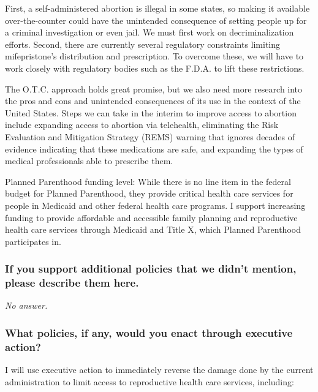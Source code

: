 First, a self-administered abortion is illegal in some states, so making
it available over-the-counter could have the unintended consequence of
setting people up for a criminal investigation or even jail. We must
first work on decriminalization efforts. Second, there are currently
several regulatory constraints limiting mifepristone's distribution and
prescription. To overcome these, we will have to work closely with
regulatory bodies such as the F.D.A. to lift these restrictions.

The O.T.C. approach holds great promise, but we also need more research
into the pros and cons and unintended consequences of its use in the
context of the United States. Steps we can take in the interim to
improve access to abortion include expanding access to abortion via
telehealth, eliminating the Risk Evaluation and Mitigation Strategy
(REMS) warning that ignores decades of evidence indicating that these
medications are safe, and expanding the types of medical professionals
able to prescribe them.

Planned Parenthood funding level: While there is no line item in the
federal budget for Planned Parenthood, they provide critical health care
services for people in Medicaid and other federal health care programs.
I support increasing funding to provide affordable and accessible family
planning and reproductive health care services through Medicaid and
Title X, which Planned Parenthood participates in.

\hypertarget{if-you-support-additional-policies-that-we-didnt-mention-please-describe-them-here-2}{%
\subsubsection{If you support additional policies that we didn't
mention, please describe them
here.}\label{if-you-support-additional-policies-that-we-didnt-mention-please-describe-them-here-2}}

\emph{No answer.}

\hypertarget{what-policies-if-any-would-you-enact-through-executive-action-2}{%
\subsubsection{What policies, if any, would you enact through executive
action?}\label{what-policies-if-any-would-you-enact-through-executive-action-2}}

I will use executive action to immediately reverse the damage done by
the current administration to limit access to reproductive health care
services, including:

